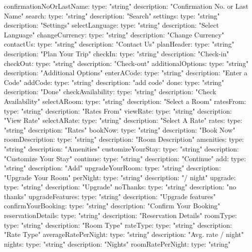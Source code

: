 \begin{codeblock}
    confirmationNoOrLastName:
      type: "string"
      description: "Confirmation No. or Last Name"
    search:
      type: "string"
      description: "Search"
    settings:
      type: "string"
      description: "Settings"
    selectLanguage:
      type: "string"
      description: "Select Language"
    changeCurrency:
      type: "string"
      description: "Change Currency"
    contactUs:
      type: "string"
      description: "Contact Us"
    planHeader:
      type: "string"
      description: "Plan Your Trip"
    checkIn:
      type: "string"
      description: "Check-in"
    checkOut:
      type: "string"
      description: "Check-out"
    additionalOptions:
      type: "string"
      description: "Additional Options"
    enterACode:
      type: "string"
      description: "Enter a Code"
    addCode:
      type: "string"
      description: "add code"
    done:
      type: "string"
      description: "Done"
    checkAvailability:
      type: "string"
      description: "Check Availability"
    selectARoom:
      type: "string"
      description: "Select a Room"
    ratesFrom:
      type: "string"
      description: "Rates From"
    viewRate:
      type: "string"
      description: "View Rate"
    selectARate:
      type: "string"
      description: "Select A Rate"
    rates:
      type: "string"
      description: "Rates"
    bookNow:
      type: "string"
      description: "Book Now"
    roomDescription:
      type: "string"
      description: "Room Description"
    amenities:
      type: "string"
      description: "Amenities"
    customizeYourStay:
      type: "string"
      description: "Customize Your Stay"
    continue:
      type: "string"
      description: "Continue"
    add:
      type: "string"
      description: "Add"
    upgradeYourRoom:
      type: "string"
      description: "Upgrade Your Room"
    perNight:
      type: "string"
      description: "/ night"
    upgrade:
      type: "string"
      description: "Upgrade"
    noThanks:
      type: "string"
      description: "no thanks"
    upgradeFeatures:
      type: "string"
      description: "Upgrade features"
    confirmYourBooking:
      type: "string"
      description: "Confirm Your Booking"
    reservationDetails:
      type: "string"
      description: "Reservation Details"
    roomType:
      type: "string"
      description: "Room Type"
    rateType:
      type: "string"
      description: "Rate Type"
    averageRatePerNight:
      type: "string"
      description: "Avg. rate / night"
    nights:
      type: "string"
      description: "Nights"
    roomRatePerNight:
      type: "string"

\end{codeblock}
